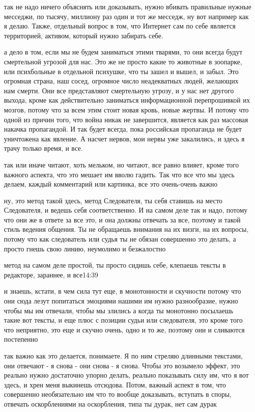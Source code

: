 так не надо ничего объяснять или доказывать, нужно вбивать правильные нужные
месседжи, по тысячу, миллиону раз один и тот же месседж, ну вот например как я
делаю. Также, отдельный вопрос в том, что Интернет сам по себе является
территорией, активом, который нужно забирать себе.

а дело в том, если мы не будем заниматься этими тварями, то они всегда будут
смертельной угрозой для нас. Это же не просто какие то животные в зоопарке, или
психбольные в отдельной психушке, что ты зашел и вышел, и забыл. Это огромная
страна, наш сосед, огромное число неадекватных людей, желающих нам смерти. Они
все представляют смертельную угрозу, и у нас нет другого выхода, кроме как
действительно заниматься информационной перепрошивкой их мозгов, потому что за
всем этим стоит новая кровь, новые жертвы. И потому что одной из причин того,
что война никак не завершится, является как раз массовая накачка пропагандой. И
так будет всегда, пока российская пропаганда не будет уничтожена как явление. А
насчет нервов, мои нервы уже закалились, и здесь я трачу только время, и все.

так или иначе читают, хоть мельком, но читают, все равно влияет, кроме того
важного аспекта, что это мешает им вволю гадить. Так что все что мы здесь
делаем, каждый комментарий или картинка, все это очень-очень важно

ну, это метод такой здесь, метод Следователя, ты себя ставишь на место
Следователя, и ведешь себя соответственно. И на самом деле так и надо, потому
что они же в ответе за все это, и она должны отвечать за все, поэтому и такой
стиль ведения общения. Ты не обращаешь внимания на их визги, на их вопросы,
потому что как следователь или судья ты не обязан совершенно это делать, а
просто гнешь свою линию, неумолимо и безжалостно

метод на самом деле простой, ты просто сидишь себе, клепаешь тексты в
редакторе, зараннее, и все14:39

и знаешь, кстати, в чем сила тут еще, в монотонности и скучности
потому что они сюда лезут попитаться эмоциями нашими
им нужно разнообразие, нужно чтобы мы им отвечали, чтобы мы злились
а когда ты монотонно посылаешь такие вот тексты, и еще плюс с позиции судьи или следователя, это кроме того что неприятно, это еще и скучно очень, одно и то же, поэтому они и сливаются постепенно


так важно как это делается, понимаете. Я по ним стреляю длинными текстами, они
отвечают - я снова - они снова - я снова. Чтобы это возымело эффект, это
реально нужно достаточно упорно делать, реально показывать силу им, что я вот
здесь, и хрен меня выкинешь отсюдова. Потом, важный аспект в том, что
совершенно необязательно им что то вообще доказывать, вступать в споры,
отвечать оскорблениями на оскорбления, типа ты дурак, нет сам дурак

